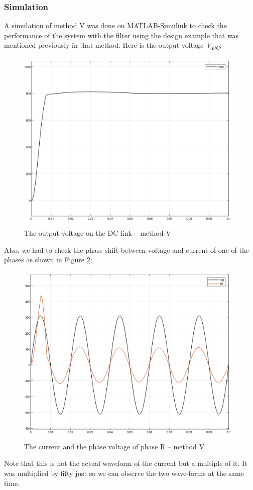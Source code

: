 \documentclass[12pt,a4paper]{book}
\begin{document}
\subsubsection{Simulation}
A simulation of method V was done on MATLAB-Simulink to check the performance of the system with the filter using the design example that was mentioned previously in that method. Here is the output voltage \emph{V\textsubscript{DC}}:

\begin{figure}[h!]
  \centering
  \includegraphics[width=11cm]{image28.png}
  \caption{The output voltage on the DC-link  -- method V}
  \label{fig:image28}
\end{figure}
Also, we had to check the phase shift between voltage and current of one of the phases as shown in Figure \ref{fig:image29}:

\begin{figure}[h!]
  \centering
  \includegraphics[width=11cm]{image29.png}
  \caption{The current and the phase voltage of phase R -- method V}
  \label{fig:image29}
\end{figure}
Note that this is not the actual waveform of the current but a multiple of it. It was multiplied by fifty just so we can observe the two wave-forms at the same time.
\end{document}
